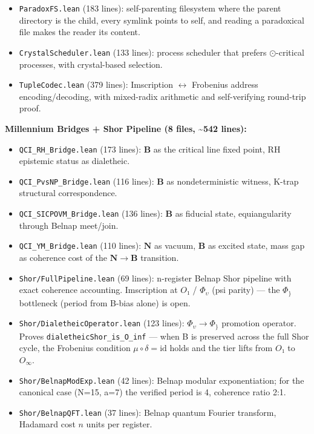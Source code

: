 \documentclass[10pt,a4paper]{article}
\begin{document}
\begin{itemize}
    \item \texttt{ParadoxFS.\allowbreak lean} (183 lines): self-parenting filesystem where the parent directory is the child, every symlink points to self, and reading a paradoxical file makes the reader its content.
    \item \texttt{CrystalScheduler.\allowbreak lean} (133 lines): process scheduler that prefers $\odot$-critical processes, with crystal-based selection.
    \item \texttt{TupleCodec.\allowbreak lean} (379 lines): Imscription $\leftrightarrow$ Frobenius address encoding/decoding, with mixed-radix arithmetic and self-verifying round-trip proof.
\end{itemize}

\textbf{Millennium Bridges + Shor Pipeline (8 files, \textasciitilde{}542 lines):}

\begin{itemize}
    \item \texttt{QCI\_\allowbreak RH\_\allowbreak Bridge.\allowbreak lean} (173 lines): $\mathbf{B}$ as the critical line fixed point, RH epistemic status as dialetheic.
    \item \texttt{QCI\_\allowbreak PvsNP\_\allowbreak Bridge.\allowbreak lean} (116 lines): $\mathbf{B}$ as nondeterministic witness, K-trap structural correspondence.
    \item \texttt{QCI\_\allowbreak SICPOVM\_\allowbreak Bridge.\allowbreak lean} (136 lines): $\mathbf{B}$ as fiducial state, equiangularity through Belnap meet/join.
    \item \texttt{QCI\_\allowbreak YM\_\allowbreak Bridge.\allowbreak lean} (110 lines): $\mathbf{N}$ as vacuum, $\mathbf{B}$ as excited state, mass gap as coherence cost of the $\mathbf{N} \to \mathbf{B}$ transition.
    \item \texttt{Shor/\allowbreak FullPipeline.\allowbreak lean} (69 lines): n-register Belnap Shor pipeline with exact coherence accounting. Imscription at $O₁$ / $\Phi_{\upsilon}$ (psi parity) --- the $\Phi_\}$ bottleneck (period from B-bias alone) is open.
    \item \texttt{Shor/\allowbreak DialetheicOperator.\allowbreak lean} (123 lines): $\Phi_{\upsilon} \to \Phi_\}$ promotion operator. Proves \texttt{dialetheicShor\_\allowbreak is\_\allowbreak O\_\allowbreak inf} --- when B is preserved across the full Shor cycle, the Frobenius condition $\mu \circ \delta = \text{id}$ holds and the tier lifts from $O₁$ to $O_{\infty}$.
    \item \texttt{Shor/\allowbreak BelnapModExp.\allowbreak lean} (42 lines): Belnap modular exponentiation; for the canonical case (N=15, a=7) the verified period is 4, coherence ratio 2:1.
    \item \texttt{Shor/\allowbreak BelnapQFT.\allowbreak lean} (37 lines): Belnap quantum Fourier transform, Hadamard cost $n$ units per register.
\end{itemize}
\end{document}

